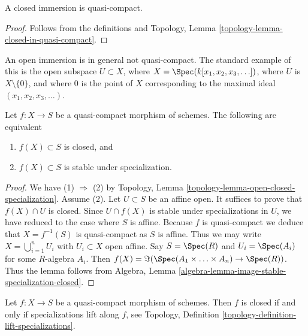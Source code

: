 \begin{lemma}
\label{lemma-closed-immersion-quasi-compact}
A closed immersion is quasi-compact.
\end{lemma}

\begin{proof}
Follows from the definitions and
Topology, Lemma \ref{topology-lemma-closed-in-quasi-compact}.
\end{proof}

\begin{example}
\label{example-open-immersion-not-quasi-compact}
An open immersion is in general not quasi-compact.
The standard example of this is the open subspace
$U \subset X$, where $X = \Spec(k[x_1, x_2, x_3, \ldots])$,
where $U$ is $X \setminus \{0\}$, and where $0$ is the point
of $X$ corresponding to the maximal ideal
$(x_1, x_2, x_3, \ldots)$.
\end{example}

\begin{lemma}
\label{lemma-image-quasi-compact-closed}
Let $f : X \to S$ be a quasi-compact morphism of schemes.
The following are equivalent
\begin{enumerate}
\item $f(X) \subset S$ is closed, and
\item $f(X) \subset S$ is stable under specialization.
\end{enumerate}
\end{lemma}

\begin{proof}
We have (1) $\Rightarrow$ (2) by
Topology, Lemma \ref{topology-lemma-open-closed-specialization}.
Assume (2). Let $U \subset S$ be an affine open. It suffices to prove
that $f(X) \cap U$ is closed. Since $U \cap f(X)$ is stable under
specializations in $U$, we have reduced to the case where $S$ is affine.
Because $f$ is quasi-compact we deduce that $X = f^{-1}(S)$ is
quasi-compact as $S$ is affine. Thus we may write
$X = \bigcup_{i = 1}^n U_i$ with $U_i \subset X$ open affine.
Say $S = \Spec(R)$ and
$U_i = \Spec(A_i)$ for some $R$-algebra $A_i$.
Then $f(X) = \Im(\Spec(A_1 \times \ldots \times A_n)
\to \Spec(R))$. Thus the lemma follows from
Algebra, Lemma \ref{algebra-lemma-image-stable-specialization-closed}.
\end{proof}

\begin{lemma}
\label{lemma-quasi-compact-closed}
Let $f : X \to S$ be a quasi-compact morphism of schemes.
Then $f$ is closed if and only if specializations lift
along $f$, see
Topology, Definition \ref{topology-definition-lift-specializations}.
\end{lemma}

